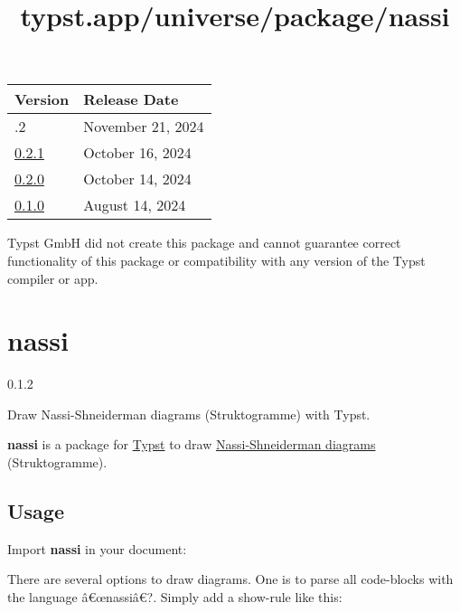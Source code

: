 \begin{longtable}[]{@{}ll@{}}
\toprule\noalign{}
Version & Release Date \\
\midrule\noalign{}
\endhead
\bottomrule\noalign{}
\endlastfoot
0.2.2 & November 21, 2024 \\
\href{https://typst.app/universe/package/rich-counters/0.2.1/}{0.2.1} &
October 16, 2024 \\
\href{https://typst.app/universe/package/rich-counters/0.2.0/}{0.2.0} &
October 14, 2024 \\
\href{https://typst.app/universe/package/rich-counters/0.1.0/}{0.1.0} &
August 14, 2024 \\
\end{longtable}

Typst GmbH did not create this package and cannot guarantee correct
functionality of this package or compatibility with any version of the
Typst compiler or app.


\title{typst.app/universe/package/nassi}

\label{banner}
\section{nassi}\label{nassi}

{ 0.1.2 }

Draw Nassi-Shneiderman diagrams (Struktogramme) with Typst.

\label{readme}
\textbf{nassi} is a package for \href{https://typst.app/}{Typst} to draw
\href{https://en.wikipedia.org/wiki/Nassi\%E2\%80\%93Shneiderman_diagram}{Nassi-Shneiderman
diagrams} (Struktogramme).


\subsection{Usage}\label{usage}

Import \textbf{nassi} in your document:

\begin{Shaded}
\begin{Highlighting}[]
\end{Highlighting}
\end{Shaded}

There are several options to draw diagrams. One is to parse all
code-blocks with the language â€œnassiâ€?. Simply add a show-rule like
this:

